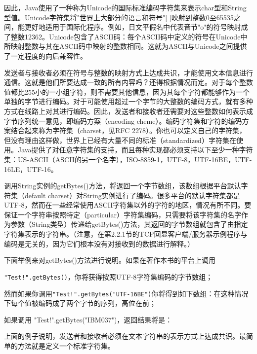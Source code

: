 		因此，Java使用了一种称为Unicode的国际标准编码字符集来表示char型和String型值。Unicode字符集将"世界上大部分的语言和符号"[ ]映射到整数0至65535之间，能更好地适用于国际化程序。例如，日文平假名中代表音节"o"的符号映射成了整数12362。Unicode包含了ASCII码：每个ASCII码中定义的符号在Unicode中所映射整数与其在ASCII码中映射的整数相同。这就为ASCII与Unicode之间提供了一定程度的向后兼容性。 

		发送者与接收者必须在符号与整数的映射方式上达成共识，才能使用文本信息进行通信。这就是他们所要达成一致的所有内容吗？还得根据情况而定。对于每个整数值都比255小的一小组字符，则不需要其他信息，因为其每个字符都能够作为一个单独的字节进行编码。对于可能使用超过一个字节的大整数的编码方式，就有多种方式在线路上对其进行编码。因此，发送者和接收者还需要对这些整数如何表示成字节序列统一意见，即编码方案（encoding cheme）。编码字符集和字符的编码方案结合起来称为字符集（charset，见RFC 2278）。你也可以定义自己的字符集，但没有理由这样做，世界上已经有大量不同的标准（standardized）字符集在使用。Java提供了对任意字符集的支持，而且每种实现都必须支持以下至少一种字符集：US-ASCII（ASCII的另一个名字），ISO-8859-1，UTF-8，UTF-16BE，UTF-16LE，UTF-16。 

		调用String实例的getBytes()方法，将返回一个字节数组，该数组根据平台默认字符集（default charset）对String实例进行了编码。很多平台的默认字符集都是UTF-8，然而在一些经常使用ASCII字符集以外的字符的地区，情况有所不同。要保证一个字符串按照特定（particular）字符集编码，只需要将该字符集的名字作为参数（String类型）传递给getBytes()方法，其返回的字节数组就包含了由指定字符集表示的字符串。（注意，在第2.2.1节的TCP回显客户端/服务器示例程序与编码是无关的，因为它们根本没有对接收到的数据进行解释。） 

		下面举例来对getBytes()方法进行说明。如果在著作本书的平台上调用
		
		\verb|"Test!".getBytes()|，你将获得按照UTF-8字符集编码的字节数组；

		

		然而如果你调用\verb|"Test!".getBytes("UTF-16BE")|你将得到如下数组：在这种情况下每个值被编码成了两个字节的序列，高位在前； 
		
		

		如果调用 "Test!".getBytes("IBM037")，返回结果将是： 

		

		上面的例子说明，发送者和接收者必须在文本字符串的表示方式上达成共识。最简单的方法就是定义一个标准字符集。 

